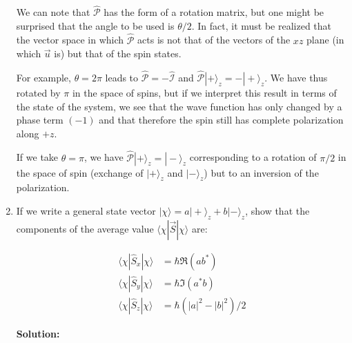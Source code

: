 \documentclass{article}
\begin{document}
\begin{enumerate}
{        We can note that $\hat{\mathcal{P}}$ has the form of a rotation matrix, but one might be surprised that the angle to be used is $\theta / 2$. In fact, it must be realized that the vector space in which $\hat{\mathcal{P}}$ acts is not that of the vectors of the $xz$ plane (in which $\vec{u}$ is) but that of the spin states.

        For example, $\theta = 2 \pi$ leads to $\hat{\mathcal{P}} = -\hat{\mathcal{I}}$ and $\hat{\mathcal{P}} |+\rangle_{z} = -|+\rangle_{z}$. We have thus rotated by $\pi$ in the space of spins, but if we interpret this result in terms of the state of the system, we see that the wave function has only changed by a phase term $(-1)$ and that therefore the spin still has complete polarization along $+z$.

        If we take $\theta = \pi$, we have $\hat{\mathcal{P}} |+\rangle_{z} = |-\rangle_{z}$ corresponding to a rotation of $\pi / 2$ in the space of spin (exchange of $|+\rangle_{z}$ and $|-\rangle_{z}$) but to an inversion of the polarization.}


    \item If we write a general state vector $|\chi\rangle = a|+\rangle_{z} + b|-\rangle_{z}$, show that the components of the average value $\langle\chi| \vec{S}|\chi\rangle$ are:

    $$
    \begin{aligned}
    \langle\chi| \hat{S}_{x}|\chi\rangle & = \hbar \Re\left(a b^{*}\right) \\
    \langle\chi| \hat{S}_{y}|\chi\rangle & = \hbar \Im\left(a^{*} b\right) \\
    \langle\chi| \hat{S}_{z}|\chi\rangle & = \hbar\left(|a|^{2} - |b|^{2}\right) / 2
    \end{aligned}
    $$

    {\color{red}\textbf{Solution:}

}
\end{enumerate}
\end{document}
